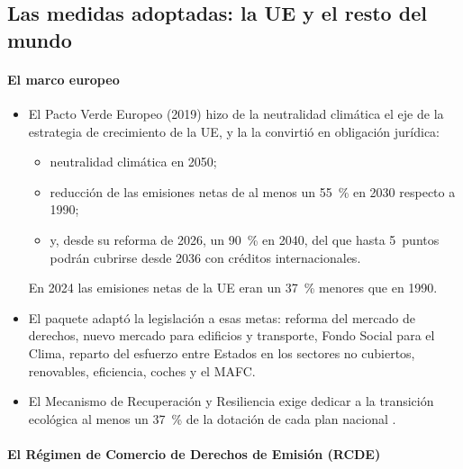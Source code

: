 \documentclass[11pt]{article}
\begin{document}
\subsection{Las medidas adoptadas: la UE y el resto del mundo}\label{sec:medidas}

\paragraph{El marco europeo}

\begin{itemize}
\item El Pacto Verde Europeo (2019) hizo de la neutralidad climática el eje de la estrategia de crecimiento de la UE, y la \nocite{UE2021Reglamento1119} la convirtió en obligación jurídica:
  \begin{itemize}
  \item neutralidad climática en 2050;
  \item reducción de las emisiones netas de al menos un 55~\% en 2030 respecto a 1990;
  \item y, desde su reforma de 2026, un 90~\% en 2040, del que hasta 5~puntos podrán cubrirse desde 2036 con créditos internacionales\nocite{UE2026Reglamento667}.
  \end{itemize}
  En 2024 las emisiones netas de la UE eran un 37~\% menores que en 1990\nocite{AEMA2025Tendencias}.
\item El paquete  adaptó la legislación a esas metas: reforma del mercado de derechos, nuevo mercado para edificios y transporte, Fondo Social para el Clima, reparto del esfuerzo entre Estados en los sectores no cubiertos, renovables, eficiencia, coches y el MAFC.
\item El Mecanismo de Recuperación y Resiliencia exige dedicar a la transición ecológica al menos un 37~\% de la dotación de cada plan nacional\nocite{UE2021Reglamento241} .
\end{itemize}

\paragraph{El Régimen de Comercio de Derechos de Emisión (RCDE)}
\end{document}
